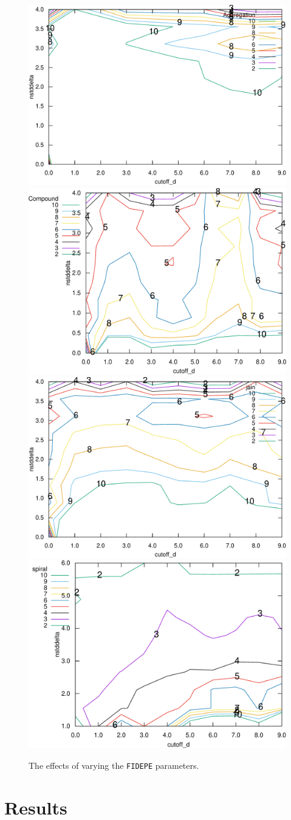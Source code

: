 \documentclass[12pt]{article}
\begin{document}
\begin{figure}[ht]
\centering
\includegraphics[width=0.47\linewidth]{../plots/fidepe/Aggregation_contour-crop}
\includegraphics[width=0.47\linewidth]{../plots/fidepe/Compound_contour-crop} \\
\includegraphics[width=0.47\linewidth]{../plots/fidepe/jain_contour-crop}
\includegraphics[width=0.47\linewidth]{../plots/fidepe/spiral_contour-crop}
\caption{The effects of varying the \texttt{FIDEPE} parameters.}
\label{fig:FIDPEPEplots}
\end{figure}
\restoregeometry
\doublespacing


\section{Results}
\end{document}
